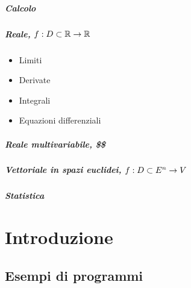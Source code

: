 \documentclass[letterpaper,10pt,english]{jupyterBook}
\begin{document}
\subsubsection*{Calcolo}


\subsubsection*{Reale, \protect\( f: D \subset \mathbb{R} \rightarrow \mathbb{R}\protect\)}
\begin{itemize}
\item {} 
\sphinxAtStartPar
Limiti

\item {} 
\sphinxAtStartPar
Derivate

\item {} 
\sphinxAtStartPar
Integrali

\item {} 
\sphinxAtStartPar
Equazioni differenziali

\end{itemize}
\subsubsection*{Reale multi\sphinxhyphen{}variabile, \$\$}
\subsubsection*{Vettoriale in spazi euclidei, \protect\( f: D \subset E^n \rightarrow V\protect\)}
\subsubsection*{Statistica}









\sphinxstepscope


\part{Introduzione}

\sphinxstepscope


\chapter{Esempi di programmi}
\label{\detokenize{ch/school-programs:esempi-di-programmi}}\label{\detokenize{ch/school-programs::doc}}
\sphinxAtStartPar
{}
\end{document}

